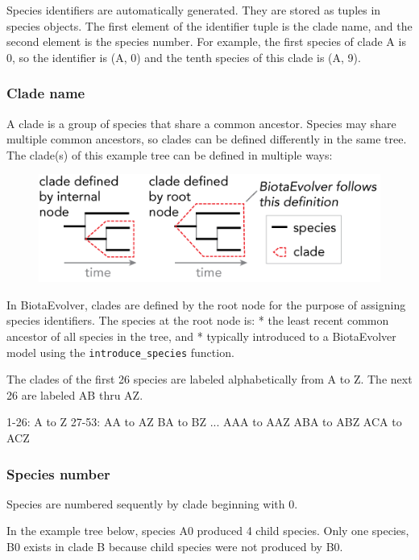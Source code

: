 \documentclass[11pt]{article}
\makeatletter
\def\maxwidth{\ifdim\Gin@nat@width>\linewidth\linewidth
    \else\Gin@nat@width\fi}
\let\Oldincludegraphics\includegraphics
\renewcommand{\includegraphics}[1]{\Oldincludegraphics[width=.8\maxwidth]{#1}}
\makeatother
\begin{document}
Species identifiers are automatically generated. They are stored as
tuples in species objects. The first element of the identifier tuple is
the clade name, and the second element is the species number. For
example, the first species of clade A is 0, so the identifier is (A, 0)
and the tenth species of this clade is (A, 9).

\subsubsection{Clade name}\label{clade-name}

A clade is a group of species that share a common ancestor. Species may
share multiple common ancestors, so clades can be defined differently in
the same tree. The clade(s) of this example tree can be defined in
multiple ways:

\begin{figure}
\centering
\includegraphics{images/clade_definitions.png}
\caption{}
\end{figure}

In BiotaEvolver, clades are defined by the root node for the purpose of
assigning species identifiers. The species at the root node is: * the
least recent common ancestor of all species in the tree, and * typically
introduced to a BiotaEvolver model using the \texttt{introduce\_species}
function.

The clades of the first 26 species are labeled alphabetically from A to
Z. The next 26 are labeled AB thru AZ.

1-26: A to Z 27-53: AA to AZ BA to BZ ... AAA to AAZ ABA to ABZ ACA to
ACZ

\subsubsection{Species number}\label{species-number}

Species are numbered sequently by clade beginning with 0.

In the example tree below, species A0 produced 4 child species. Only one
species, B0 exists in clade B because child species were not produced by
B0.
\end{document}
